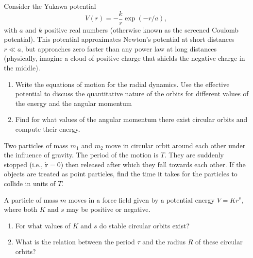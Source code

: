\documentclass{jhwhw}
\begin{document}
Consider the Yukawa potential
\begin{equation}
  \label{eq:4}
  V(r) = - \frac{k}{r} \exp(- r/a),
\end{equation}
with $a$ and $k$ positive real numbers (otherwise known as the screened Coulomb potential).
This potential approximates Newton's potential at short distances $r\ll a$, but approaches zero faster than any power law at long distances (physically, imagine a cloud of positive charge that shields the negative charge in the middle).
\begin{enumerate}
  \item Write the equations of motion for the radial dynamics. Use the effective potential to discuss the quantitative nature of the orbits for different values of the energy and the angular momentum
  \item Find for what values of the angular momentum there exist circular orbits and compute their energy.
\end{enumerate}


Two particles of mass $m_{1}$ and $m_{2}$ move in circular orbit around each other under the influence of gravity.
The period of the motion is $T$.
They are suddenly stopped (i.e., $\dot {\mathbf r} = 0$) then released after which they fall towards each other.
If the objects are treated as point particles, find the time it takes for the particles to collide in units of $T$.


A particle of mass $m$ moves in a force field given by a potential energy $V = K r^{s}$, where both $K$ and $s$ may be positive or negative.
\begin{enumerate}
  \item For what values of $K$ and $s$ do stable circular orbits exist?
  \item What is the relation between the period $\tau$ and the radius $R$ of these circular orbits?
\end{enumerate}

\end{document}
